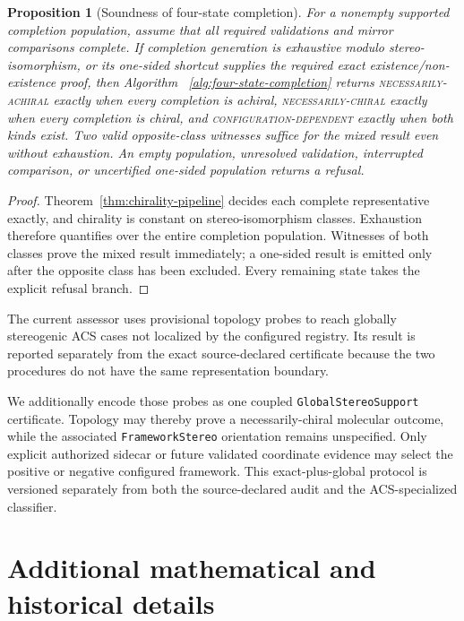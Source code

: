 \documentclass[pdflatex,sn-mathphys-num,referee,lineno]{sn-jnl}
\newcommand{\code}[1]{\texttt{#1}}
\theoremstyle{plain}
\newtheorem{proposition}[theorem]{Proposition}
\theoremstyle{remark}
\theoremstyle{definition}
\begin{document}
\begin{proposition}[Soundness of four-state completion]
\label{prop:four-state}
For a nonempty supported completion population, assume that all required
validations and mirror comparisons complete. If completion generation is
exhaustive modulo stereo-isomorphism, or its one-sided shortcut supplies the
required exact existence/non-existence proof, then Algorithm~
\ref{alg:four-state-completion} returns \textsc{necessarily-achiral} exactly
when every completion is achiral, \textsc{necessarily-chiral} exactly when
every completion is chiral, and \textsc{configuration-dependent} exactly when
both kinds exist. Two valid opposite-class witnesses suffice for the mixed
result even without exhaustion. An empty population, unresolved validation,
interrupted comparison, or uncertified one-sided population returns a refusal.
\end{proposition}

\begin{proof}
Theorem~\ref{thm:chirality-pipeline} decides each complete representative
exactly, and chirality is constant on stereo-isomorphism classes.  Exhaustion
therefore quantifies over the entire completion population.  Witnesses of both
classes prove the mixed result immediately; a one-sided result is emitted only
after the opposite class has been excluded.  Every remaining state takes the
explicit refusal branch.
\end{proof}

The current assessor uses provisional topology probes to reach globally
stereogenic ACS cases not localized by the configured registry.  Its result is
reported separately from the exact source-declared certificate because the two
procedures do not have the same representation boundary.

We additionally encode those probes as one coupled
\code{GlobalStereoSupport} certificate.  Topology may thereby prove a
necessarily-chiral molecular outcome, while the associated
\code{FrameworkStereo} orientation remains unspecified.  Only explicit
authorized sidecar or future validated coordinate evidence may select the
positive or negative configured framework.  This exact-plus-global protocol
is versioned separately from both the source-declared audit and the
ACS-specialized classifier.


\section{Additional mathematical and historical details}
\label{sec:additional-details}
\end{document}
